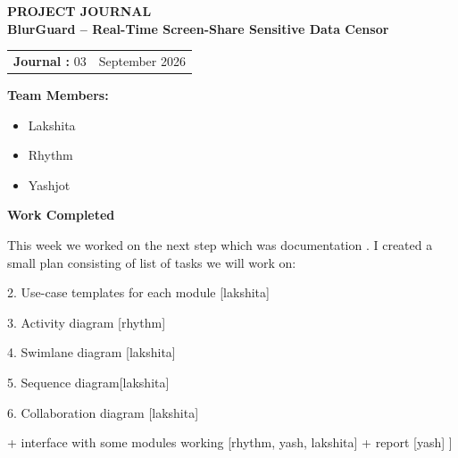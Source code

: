 \documentclass[12pt,a4paper]{article}
\begin{document}

\begin{center}
    {\Large \textbf{PROJECT JOURNAL }}\\[10pt]

    {\large \textbf{BlurGuard -- Real-Time Screen-Share Sensitive Data Censor}}
\end{center}

\vspace{10pt}


\begin{tabular}{@{}p{}p{}@{}}
\textbf{Journal :} 03 &
\raggedleft \textbf{} September 2026
\end{tabular}

\vspace{12pt}


\textbf{Team Members:}

\begin{itemize}[leftmargin=1.5cm]
    \item Lakshita
    \item Rhythm
    \item Yashjot
\end{itemize}

\vspace{5pt}


\textbf{\large Work Completed}

\vspace{4pt}
This week we worked on the next step which was documentation . I created a small plan consisting of list of tasks we will work on:
\par
[ Plan : all diagrams(NO AI, All diagrams must have same modules and user list that should be fixed beforehand):\par
1. Use case diagram [rhythm]\par
2. Use-case templates for each module [lakshita]\par
3. Activity diagram [rhythm]\par
4. Swimlane diagram [lakshita]\par
5. Sequence diagram[lakshita]\par
6. Collaboration diagram [lakshita]\par
+ interface with some modules working [rhythm, yash, lakshita]
 + report [yash] ]
\end{document}
